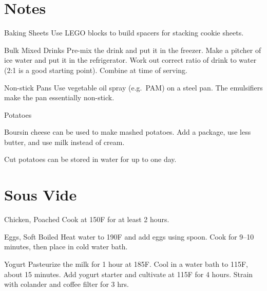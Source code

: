 \documentclass[oneside]{book}  %
\def\thisrecipe{}  %
\newcommand{\chapterrec}[1]{  %
  \newpage \def\thisrecipe{} \chapter{#1} \vspace{1.1em}
}
\newcommand{\degF}{\textdegree F\xspace}
\begin{document}
\frontmatter {} \tableofcontents

\mainmatter

\chapterrec{Notes} \label{chap:notes} %
\begin{kitchennotes}[font=\MakeUppercase]
  \item[Baking Sheets]
    Use LEGO blocks to build spacers for stacking cookie sheets.

  \item[Bulk Mixed Drinks]
    Pre-mix the drink and put it in the freezer. Make a pitcher of ice water and
    put it in the refrigerator. Work out correct ratio of drink to water (2:1 is
    a good starting point). Combine at time of serving.

  \item[Non-stick Pans]
    Use vegetable oil spray (e.g.\ PAM) on a steel pan. The emulsifiers make the
    pan essentially non-stick.

  \item[Potatoes] \begin{kitchensubnotes}
    \item Boursin cheese can be used to make mashed potatoes. Add a package, use
      less butter, and use milk instead of cream.
    \item Cut potatoes can be stored in water for up to one day.
  \end{kitchensubnotes}
\end{kitchennotes}

\chapterrec{Sous Vide} \label{chap:sous_vide} %
\begin{kitchennotes}
  \item[Chicken, Poached]
      
    Cook at 150\degF for at least 2 hours.

  \item[Eggs, Soft Boiled]
      
    Heat water to 190\degF and add eggs using spoon. Cook for 9--10 minutes,
    then place in cold water bath.

  \item[Yogurt]
     
    Pasteurize the milk for 1 hour at 185\degF. Cool in a water bath to
    115\degF, about 15 minutes. Add yogurt starter and cultivate at 115\degF
    for 4 hours. Strain with colander and coffee filter for 3 hrs.
\end{kitchennotes}
\end{document}
